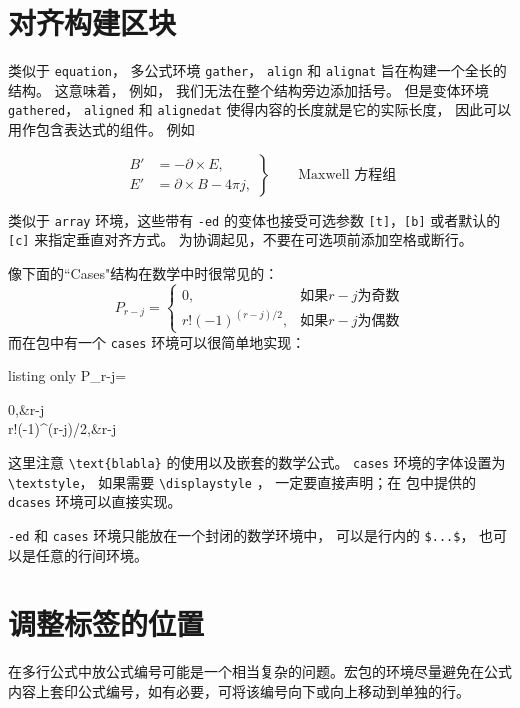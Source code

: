 \section{对齐构建区块}
类似于 \verb|equation|，  多公式环境 \verb|gather|，  \verb|align| 和 \verb|alignat| 旨在构建一个全长的结构。 这意味着，  例如，  我们无法在整个结构旁边添加括号。 但是变体环境 \verb|gathered|，  \verb|aligned| 和 \verb|alignedat| 使得内容的长度就是它的实际长度，  因此可以用作包含表达式的组件。 例如
\begin{tcblisting}{}
\begin{equation*}
\left.\begin{aligned}
B'&=-\partial\times E,\\
E'&=\partial\times B-4\pi j,
\end{aligned}
\right\}
\qquad \text{Maxwell 方程组}
\end{equation*}
\end{tcblisting}

类似于 \verb|array| 环境，这些带有 \verb|-ed| 的变体也接受可选参数 \verb|[t]|，\verb|[b]| 或者默认的 \verb|[c]| 来指定垂直对齐方式。 为协调起见，不要在可选项前添加空格或断行。

像下面的``Cases"结构在数学中时很常见的：
\begin{equation}
P_{r-j}=\begin{cases}
0,&\text{如果}r-j\text{为奇数}\\
r!(-1)^{(r-j)/2},&\text{如果}r-j\text{为偶数}
\end{cases}
\end{equation}
而在包中有一个 \verb|cases| 环境可以很简单地实现：
\begin{tcblisting}{listing only}
P_{r-j}=\begin{cases}
0,&r-j\\
r!(-1)^{(r-j)/2},&r-j
\end{cases}
\end{tcblisting}
\noindent 这里注意 \verb|\text{blabla}| 的使用以及嵌套的数学公式。  \verb|cases| 环境的字体设置为 \verb|\textstyle|，   如果需要 \verb|\displaystyle| ，  一定要直接声明；在  包中提供的 \verb|dcases| 环境可以直接实现。

\verb|-ed| 和 \verb|cases| 环境只能放在一个封闭的数学环境中，  可以是行内的 \verb|$...$|，  也可以是任意的行间环境。

\section{调整标签的位置}
在多行公式中放公式编号可能是一个相当复杂的问题。宏包的环境尽量避免在公式内容上套印公式编号，如有必要，可将该编号向下或向上移动到单独的行。


